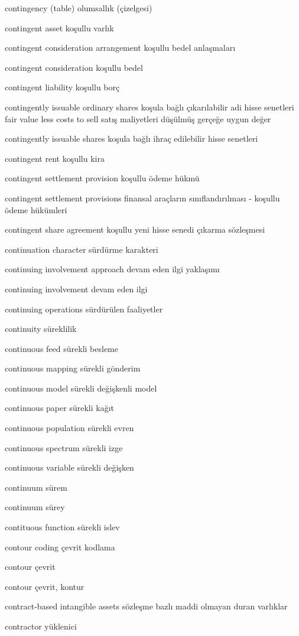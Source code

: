 \documentclass[12pt,fleqn]{article}\usepackage{../../common}
\begin{document}
contingency (table) olumsallık (çizelgesi)

contingent asset koşullu varlık

contingent consideration arrangement koşullu bedel anlaşmaları

contingent consideration koşullu bedel

contingent liability koşullu borç

contingently issuable ordinary shares koşula bağlı çıkarılabilir adi hisse senetleri fair value less costs to sell satış maliyetleri düşülmüş gerçeğe uygun değer

contingently issuable shares koşula bağlı ihraç edilebilir hisse senetleri

contingent rent koşullu kira

contingent settlement provision koşullu ödeme hükmü

contingent settlement provisions finansal araçların sınıflandırılması - koşullu ödeme hükümleri

contingent share agreement koşullu yeni hisse senedi çıkarma sözleşmesi

continuation character sürdürme karakteri

continuing involvement approach devam eden ilgi yaklaşımı

continuing involvement devam eden ilgi

continuing operations sürdürülen faaliyetler

continuity süreklilik

continuous feed sürekli besleme

continuous mapping sürekli gönderim

continuous model sürekli değişkenli model

continuous paper sürekli kağıt

continuous population sürekli evren

continuous spectrum sürekli izge

continuous variable sürekli değişken

continuum sürem

continuum sürey

contituous function sürekli islev

contour coding çevrit kodlama

contour çevrit

contour çevrit, kontur

contract-based intangible assets sözleşme bazlı maddi olmayan duran varlıklar

contractor yüklenici
\end{document}
